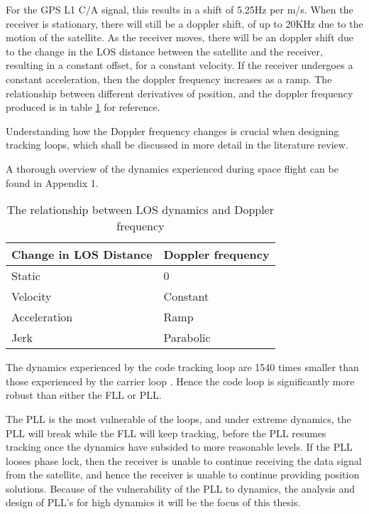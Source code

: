 For the GPS L1 \ac{C/A} signal, this results in a shift of 5.25Hz per m/s. 
When the receiver is stationary, there will still be a doppler shift, of up to 20KHz due to the motion of the satellite\cite{Kaplan}. As the receiver moves, there will be an doppler shift due to the change in the \ac{LOS} distance between the satellite and the receiver, resulting in a constant offset, for a constant velocity. If the receiver undergoes a constant acceleration, then the doppler frequency increases as a ramp. The relationship between different derivatives of position, and the doppler frequency produced is in table \ref{table:DopplerDynamics} for reference.

Understanding how the Doppler frequency changes is crucial when designing tracking loops, which shall be discussed in more detail in the literature review. 

A thorough overview of the dynamics experienced during space flight can be found in Appendix 1.
\begin{table}[!htb]
\centering
\begin{tabular}{|l|l|}
\hline
\rowcolor[HTML]{C0C0C0} 
Change in \ac{LOS} Distance & Doppler frequency \\ \hline
Static                 & 0                 \\ \hline
\rowcolor[HTML]{EFEFEF} 
Velocity               & Constant          \\ \hline
Acceleration           & Ramp              \\ \hline
\rowcolor[HTML]{EFEFEF} 
Jerk                   & Parabolic         \\ \hline
\end{tabular}
\caption{The relationship between \ac{LOS} dynamics and Doppler frequency}
\label{table:DopplerDynamics}
\end{table}


The dynamics experienced by the code tracking loop are 1540 times smaller than those experienced by the carrier loop \cite{Kaplan}. Hence the  code loop is significantly more robust than either the \ac{FLL} or \ac{PLL}.

The \ac{PLL} is the most vulnerable of the loops, and under extreme dynamics, the \ac{PLL} will break while the \ac{FLL} will keep tracking, before the \ac{PLL} resumes tracking once the dynamics have subsided to more reasonable levels. If the \ac{PLL} looses phase lock, then the receiver is unable to continue receiving the data signal from the satellite, and hence the receiver is unable to continue providing position solutions. Because of the vulnerability of the \ac{PLL} to dynamics, the analysis and design of \ac{PLL}'s for high dynamics it will be the focus of this thesis. 






